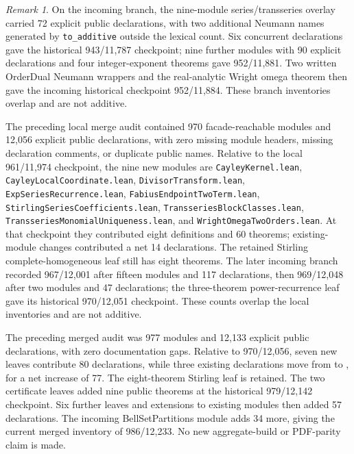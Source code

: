 \documentclass[11pt,oneside]{article}
\theoremstyle{definition}
\theoremstyle{remark}
\newtheorem{remark}[theorem]{Remark}
\begin{document}
\begin{remark}
On the incoming branch, the nine-module series/transseries overlay carried
72 explicit public declarations, with two additional Neumann names generated
by \nolinkurl{to_additive} outside the lexical count.  Six concurrent declarations
gave the historical 943/11,787 checkpoint; nine further modules with 90
explicit declarations and four integer-exponent theorems gave 952/11,881.
Two written OrderDual Neumann wrappers and the real-analytic Wright omega
theorem then gave the incoming historical checkpoint 952/11,884.
These branch inventories overlap and are not additive.

The preceding local merge audit contained 970 facade-reachable modules and
12,056 explicit public declarations, with zero missing module headers,
missing declaration comments, or duplicate public names.  Relative to the
local 961/11,974 checkpoint, the nine new modules are
\nolinkurl{CayleyKernel.lean}, \nolinkurl{CayleyLocalCoordinate.lean},
\nolinkurl{DivisorTransform.lean}, \nolinkurl{ExpSeriesRecurrence.lean},
\nolinkurl{FabiusEndpointTwoTerm.lean}, \nolinkurl{StirlingSeriesCoefficients.lean},
\nolinkurl{TransseriesBlockClasses.lean},
\nolinkurl{TransseriesMonomialUniqueness.lean}, and
\nolinkurl{WrightOmegaTwoOrders.lean}.  At that checkpoint they contributed eight definitions and
60 theorems; existing-module changes contributed a net 14 declarations.
The retained Stirling complete-homogeneous leaf still has eight theorems.
The later incoming branch recorded 967/12,001 after fifteen modules and
117 declarations, then 969/12,048 after two modules and 47 declarations;
the three-theorem power-recurrence leaf gave its historical 970/12,051
checkpoint.  These counts overlap the local inventories and are not additive.

The preceding merged audit was 977 modules and 12,133 explicit public
declarations, with zero documentation gaps.  Relative to 970/12,056, seven
new leaves contribute 80 declarations, while three existing declarations
move from  to ,
for a net increase of 77.  The eight-theorem Stirling leaf is retained.
The two certificate leaves added nine public theorems at the historical
979/12,142 checkpoint. Six further leaves and extensions to existing modules
then added 57 declarations. The incoming BellSetPartitions module adds 34
more, giving the current merged inventory of 986/12,233. No new aggregate-build
or PDF-parity claim is made.


\end{remark}
\end{document}
